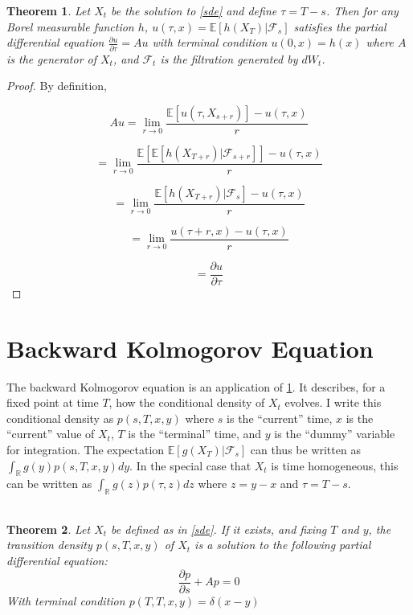 \documentclass{article}
\newtheorem{theorem}{Theorem}
\theoremstyle{definition}
\begin{document}
\begin{theorem}\label{fk}
	Let \(X_t\) be the solution to \ref{sde} and define \(\tau=T-s\).  Then for any Borel measurable function \(h\),
	\(u(\tau, x)=\mathbb{E}[h(X_T)|\mathcal{F}_s]\) satisfies the partial differential equation
	\(\frac{\partial u}{\partial \tau} = Au \) with terminal condition \(u(0, x)=h(x)\)
	where \(A\) is the generator of \(X_t\),  and \(\mathcal{F}_t\) is the filtration generated by \(dW_t\).
	
\end{theorem}

\begin{proof}
	
	By definition, 
	
	\[Au=\lim_{r \to 0} \frac{\mathbb{E}\left[ u(\tau, X_{s+r}) \right] - u(\tau, x)}{r} \]
	
	\[ =  \lim_{r \to 0} \frac{\mathbb{E}\left[ \mathbb{E}\left[ h(X_{T+r}) | \mathcal{F}_{s+r} \right] \right] - u(\tau, x)}{r} \]
	
	\[ =  \lim_{r \to 0} \frac{ \mathbb{E}\left[ h(X_{T+r}) | \mathcal{F}_{s} \right] - u(\tau, x)}{r} \]
	
	\[ =  \lim_{r \to 0} \frac{ u(\tau+r, x) - u(\tau, x)}{r} \]
	
	\[= \frac{\partial u}{\partial \tau}\]
	

\end{proof}


\section{Backward Kolmogorov Equation}

The backward Kolmogorov equation is an application of \ref{fk}.  It describes, for a fixed point at time \(T\), how the conditional density of \(X_t\) evolves.  I write this conditional density as \(p(s, T, x, y)\) where \(s\) is the ``current'' time, \(x\) is the ``current'' value of \(X_t\), \(T\) is the ``terminal'' time, and \(y\) is the ``dummy'' variable for integration.  The expectation \(\mathbb{E}[g(X_T)|\mathcal{F}_s]\) can thus be written as \(\int_\mathbb{R} g(y) p(s, T, x, y) dy \).  In the special case that \(X_t\) is time homogeneous, this can be written as \(\int_\mathbb{R} g(z) p(\tau, z) dz \) where \(z=y-x\) and \(\tau=T-s\).  
\\
\\
\begin{theorem}\label{bk}
	Let \(X_t\) be defined as in \ref{sde}. If it exists, and fixing \(T\) and \(y\), the transition density \(p(s, T, x, y)\) of \(X_t\) is a solution to the following partial differential equation:
	\[\frac{\partial p}{\partial s} + Ap=0 \]
	With terminal condition \(p(T, T, x, y)=\delta(x-y)\)
\end{theorem}
\end{document}
